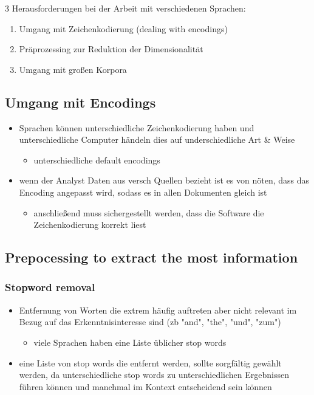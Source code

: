 \documentclass[11pt]{article}
\begin{document}
3 Herausforderungen bei der Arbeit mit verschiedenen Sprachen:
\begin{enumerate}
\item Umgang mit Zeichenkodierung (dealing with encodings)
\item Präprozessing zur Reduktion der Dimensionalität
\item Umgang mit großen Korpora
\end{enumerate}
\subsection{Umgang mit Encodings}
\label{sec:orgf59f1bd}
\begin{itemize}
\item Sprachen können unterschiedliche Zeichenkodierung haben und unterschiedliche Computer händeln dies auf underschiedliche Art \& Weise
\begin{itemize}
\item unterschiedliche default encodings
\end{itemize}
\item wenn der Analyst Daten aus versch Quellen bezieht ist es von nöten, dass das Encoding angepasst wird, sodass es in allen Dokumenten gleich ist 
\begin{itemize}
\item anschließend muss sichergestellt werden, dass die Software die Zeichenkodierung korrekt liest
\end{itemize}
\end{itemize}

\subsection{Prepocessing to extract the most information}
\label{sec:orgba79536}
\subsubsection{Stopword removal}
\label{sec:org89891dc}
\begin{itemize}
\item Entfernung von Worten die extrem häufig auftreten aber nicht relevant im Bezug auf das Erkenntnisinteresse sind (zb "and", "the", "und", "zum")
\begin{itemize}
\item viele Sprachen haben eine Liste üblicher stop words
\end{itemize}
\item eine Liste von stop words die entfernt werden, sollte sorgfältig gewählt werden, da unterschiedliche stop words zu unterschiedlichen Ergebnissen führen können und manchmal im Kontext entscheidend sein können
\end{itemize}
\end{document}
